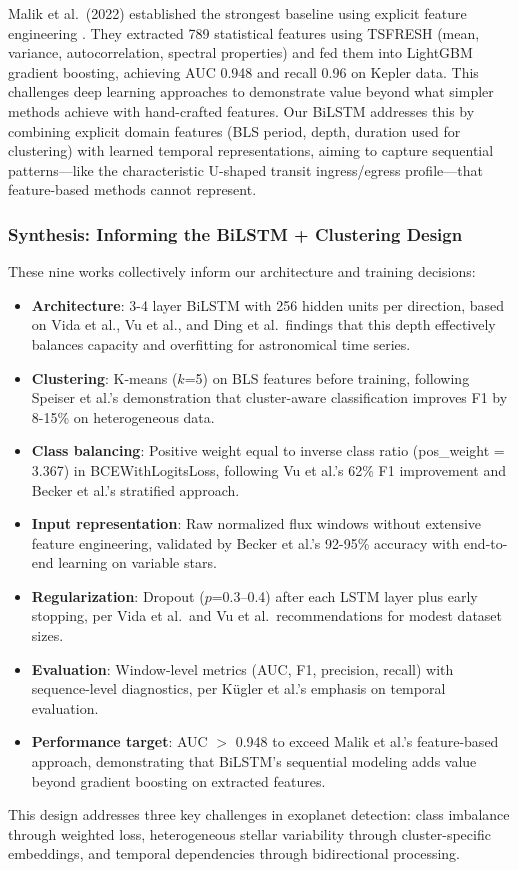 Malik et al.\ (2022) established the strongest baseline using explicit feature engineering \cite{Malik2022exoplanetdetection}. They extracted 789 statistical features using TSFRESH (mean, variance, autocorrelation, spectral properties) and fed them into LightGBM gradient boosting, achieving AUC 0.948 and recall 0.96 on Kepler data. This challenges deep learning approaches to demonstrate value beyond what simpler methods achieve with hand-crafted features. Our BiLSTM addresses this by combining explicit domain features (BLS period, depth, duration used for clustering) with learned temporal representations, aiming to capture sequential patterns---like the characteristic U-shaped transit ingress/egress profile---that feature-based methods cannot represent.

\subsubsection{Synthesis: Informing the BiLSTM + Clustering Design}

These nine works collectively inform our architecture and training decisions:

\begin{itemize}
    \item \textbf{Architecture}: 3-4 layer BiLSTM with 256 hidden units per direction, based on Vida et al., Vu et al., and Ding et al.\ findings that this depth effectively balances capacity and overfitting for astronomical time series.

    \item \textbf{Clustering}: K-means ($k$=5) on BLS features before training, following Speiser et al.'s demonstration that cluster-aware classification improves F1 by 8-15\% on heterogeneous data.

    \item \textbf{Class balancing}: Positive weight equal to inverse class ratio (pos\_weight = 3.367) in BCEWithLogitsLoss, following Vu et al.'s 62\% F1 improvement and Becker et al.'s stratified approach.

    \item \textbf{Input representation}: Raw normalized flux windows without extensive feature engineering, validated by Becker et al.'s 92-95\% accuracy with end-to-end learning on variable stars.

    \item \textbf{Regularization}: Dropout ($p$=0.3--0.4) after each LSTM layer plus early stopping, per Vida et al.\ and Vu et al.\ recommendations for modest dataset sizes.

    \item \textbf{Evaluation}: Window-level metrics (AUC, F1, precision, recall) with sequence-level diagnostics, per K\"ugler et al.'s emphasis on temporal evaluation.

    \item \textbf{Performance target}: AUC $>$ 0.948 to exceed Malik et al.'s feature-based approach, demonstrating that BiLSTM's sequential modeling adds value beyond gradient boosting on extracted features.
\end{itemize}

This design addresses three key challenges in exoplanet detection: class imbalance through weighted loss, heterogeneous stellar variability through cluster-specific embeddings, and temporal dependencies through bidirectional processing.
